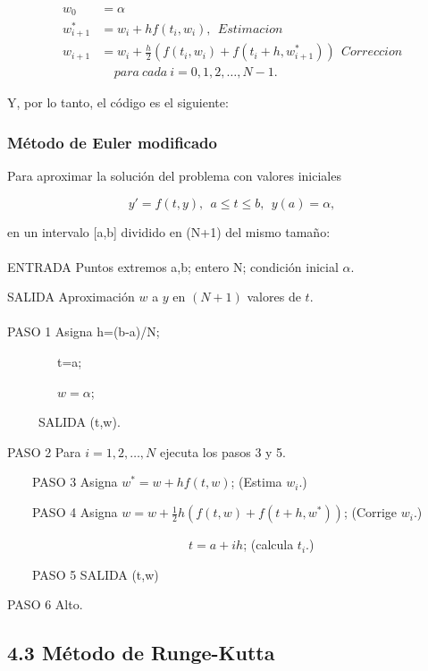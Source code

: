 \begin{equation*}
\begin{split}
    w_0&=\alpha \\
    w^*_{i+1}&=w_i+hf(t_i,w_i), \ \ Estimacion \\
    w_{i+1}&=w_i+\frac{h}{2}(f(t_i,w_i)+f(t_i+h,w^*_{i+1})) \ \ Correccion \\ 
    & \ \ \ \ \ para \ cada \ i=0,1,2, \dotsc, N-1.
\end{split}
\end{equation*}

Y, por lo tanto, el código es el siguiente:


\begin{tcolorbox}[colback=blue!15!]
\subsubsection*{Método de Euler modificado}
Para aproximar la solución del problema con valores iniciales

\begin{equation*}
    y'=f(t,y), \ \  a\leq t\leq b, \ \ y(a)=\alpha,
\end{equation*}

en un intervalo [a,b] dividido en (N+1) del mismo tamaño:
\\ \\
ENTRADA Puntos extremos a,b; entero N; condición inicial $\alpha$.

SALIDA Aproximación $w$ a $y$ en $(N+1)$ valores de $t$.
\\ \\
PASO 1 Asigna h=(b-a)/N;

\ \ \ \ \ \ \ \ t=a;

\ \ \ \ \ \ \ \ $w=\alpha$;

\ \ \ \ \  SALIDA (t,w).

PASO 2 Para $i=1,2,\dotsc, N$ ejecuta los pasos 3 y 5.

\ \ \ \  PASO 3 Asigna $w^*=w+hf(t,w)$; (Estima $w_i$.)

\ \ \ \  PASO 4 Asigna $w=w+\frac{1}{2}h(f(t,w)+f(t+h,w^*))$; (Corrige $w_i$.)

\ \ \ \ \ \ \ \ \ \ \ \ \ \ \ \ \ \ \ \ \ \ \ \ \ \ \ \ \ $t=a+ih$; (calcula $t_i$.)

\ \ \ \  PASO 5  SALIDA (t,w)

PASO 6 Alto.

\end{tcolorbox}

\subsection*{4.3 Método de Runge-Kutta}

